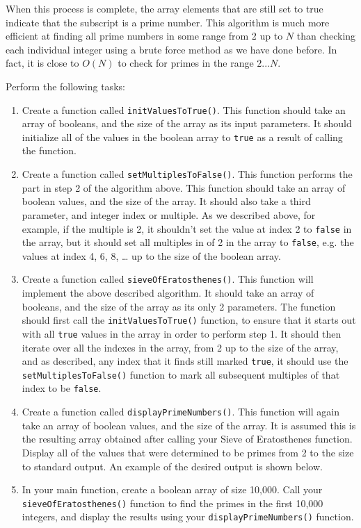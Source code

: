 \documentclass[11pt]{article}
\begin{document}
When this process is complete, the array elements that are still set
to true indicate that the subscript is a prime number.  This algorithm
is much more efficient at finding all prime numbers in some range from
2 up to $N$ than checking each individual integer using a brute force method
as we have done before.  In fact, it is close to $O(N)$ to check for primes
in the range $2 ... N$.

Perform the following tasks:

\begin{enumerate}
\item Create a function called \verb~initValuesToTrue()~.  This function should
   take an array of booleans, and the size of the array as its input
   parameters.  It should initialize all of the values in the boolean 
   array to \verb~true~ as a result of calling the function.
\item Create a function called \verb~setMultiplesToFalse()~.  This function
   performs the part in step 2 of the algorithm above.  This function
   should take an array of boolean values, and the size of the array.
   It should also take a third parameter, and integer index or
   multiple.  As we described above, for example, if the multiple is
   2, it shouldn't set the value at index 2 to \verb~false~ in the array,
   but it should set all multiples in of 2 in the array to \verb~false~,
   e.g. the values at index 4, 6, 8, \ldots{}  up to the size of the
   boolean array.
\item Create a function called \verb~sieveOfEratosthenes()~.  This function
   will implement the above described algorithm.  It should take
   an array of booleans, and the size of the array as its only 2 parameters.
   The function should first call the \verb~initValuesToTrue()~ function, to
   ensure that it starts out with all \verb~true~ values in the array in
   order to perform step 1.  It should then iterate over all the
   indexes in the array, from 2 up to the size of the array, and as
   described, any index that it finds still marked \verb~true~, it should
   use the \verb~setMultiplesToFalse()~ function to mark all subsequent
   multiples of that index to be \verb~false~.
\item Create a function called \verb~displayPrimeNumbers()~.  This function
   will again take an array of boolean values, and the size of the
   array.  It is assumed this is the resulting array obtained after
   calling your Sieve of Eratosthenes function.  Display all of
   the values that were determined to be primes from 2 to the size
   to standard output.  An example of the desired output is shown below.
\item In your main function, create a boolean array of size 10,000.  Call your
   \verb~sieveOfEratosthenes()~ function to find the primes in the first 10,000
   integers, and display the results using your \verb~displayPrimeNumbers()~
   function.
\end{enumerate}
\end{document}

